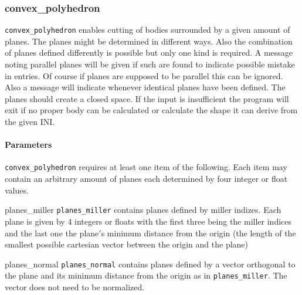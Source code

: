 \subsubsection{convex\_polyhedron}

\lstinline{convex_polyhedron} enables cutting of bodies surrounded by a given amount of planes. The planes might be determined in different ways. Also the combination of planes defined differently is possible but only one kind is required. A message noting parallel planes will be given if such are found to indicate possible mistake in entries. Of course if planes are supposed to be parallel this can be ignored. Also a message will indicate whenever identical planes have been defined. The planes should create a closed space. If the input is insufficient the program will exit if no proper body can be calculated or calculate the shape it can derive from the given INI.

\paragraph{Parameters}
\lstinline{convex_polyhedron} requires at least one item of the following. Each item may contain an arbitrary amount of planes each determined by four integer or float values.
\begin{description}
 \item{planes\_miller} \lstinline{planes_miller} contains planes defined by miller indizes. Each plane is given by 4 integers or floats with the first three being the miller indices and the last one the plane$'$s minimum distance from the origin (the length of the smallest possible cartesian vector between the origin and the plane)
 \item{planes\_normal} \lstinline{planes_normal} contains planes defined by a vector orthogonal to the plane and its minimum distance from the origin as in \lstinline{planes_miller}. The vector does not need to be normalized.
\end{description} 

